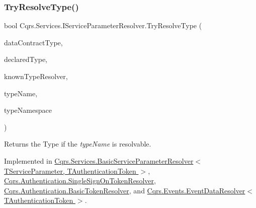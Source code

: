 \mbox{\label{interfaceCqrs_1_1Services_1_1IServiceParameterResolver_a31c82a00b192b877faff6df99e1b689b_a31c82a00b192b877faff6df99e1b689b}} 
\subsubsection{\texorpdfstring{Try\+Resolve\+Type()}{TryResolveType()}}
{\footnotesize\ttfamily bool Cqrs.\+Services.\+I\+Service\+Parameter\+Resolver.\+Try\+Resolve\+Type (\begin{DoxyParamCaption}\item[{Type}]{data\+Contract\+Type,  }\item[{Type}]{declared\+Type,  }\item[{Data\+Contract\+Resolver}]{known\+Type\+Resolver,  }\item[{out Xml\+Dictionary\+String}]{type\+Name,  }\item[{out Xml\+Dictionary\+String}]{type\+Namespace }\end{DoxyParamCaption})}



Returns the Type if the {\itshape type\+Name}  is resolvable. 



Implemented in \hyperlink{classCqrs_1_1Services_1_1BasicServiceParameterResolver_adbc4b10f8931db30768d7ca84bdb0260_adbc4b10f8931db30768d7ca84bdb0260}{Cqrs.\+Services.\+Basic\+Service\+Parameter\+Resolver$<$ T\+Service\+Parameter, T\+Authentication\+Token $>$}, \hyperlink{classCqrs_1_1Authentication_1_1SingleSignOnTokenResolver_af474315b8fc66d17d64460fab8c63dd1_af474315b8fc66d17d64460fab8c63dd1}{Cqrs.\+Authentication.\+Single\+Sign\+On\+Token\+Resolver}, \hyperlink{classCqrs_1_1Authentication_1_1BasicTokenResolver_aee92bd9283bf949149a351c8d8cdb079_aee92bd9283bf949149a351c8d8cdb079}{Cqrs.\+Authentication.\+Basic\+Token\+Resolver}, and \hyperlink{classCqrs_1_1Events_1_1EventDataResolver_a62be7cd15bb38f3a4054a62e787c473d_a62be7cd15bb38f3a4054a62e787c473d}{Cqrs.\+Events.\+Event\+Data\+Resolver$<$ T\+Authentication\+Token $>$}.

